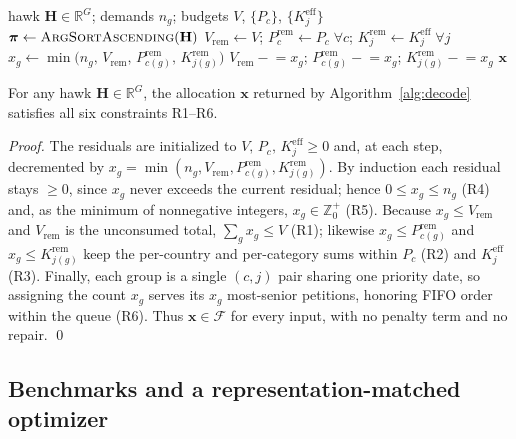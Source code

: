 \documentclass[runningheads]{llncs}
\begin{document}
\begin{algorithm}[t]
\caption{Feasibility-preserving SPV + greedy decoder}
\label{alg:decode}
\begin{algorithmic}[1]
\Require hawk $\mathbf{H}\in\mathbb{R}^{G}$; demands $n_g$; budgets $V$, $\{P_c\}$, $\{K_j^{\text{eff}}\}$
\State $\boldsymbol{\pi} \gets \textsc{ArgSortAscending}(\mathbf{H})$ 
\State $V_{\text{rem}} \gets V$;\; $P^{\text{rem}}_c \gets P_c\;\forall c$;\; $K^{\text{rem}}_j \gets K_j^{\text{eff}}\;\forall j$
 
  \State $x_g \gets \min\bigl(n_g,\, V_{\text{rem}},\, P^{\text{rem}}_{c(g)},\, K^{\text{rem}}_{j(g)}\bigr)$
  \State $V_{\text{rem}} \mathrel{-}= x_g$;\; $P^{\text{rem}}_{c(g)} \mathrel{-}= x_g$;\; $K^{\text{rem}}_{j(g)} \mathrel{-}= x_g$
\EndFor
\State \Return $\mathbf{x}$ 
\end{algorithmic}
\end{algorithm}

\begin{proposition}
\label{prop:feas}
For any hawk $\mathbf{H}\in\mathbb{R}^{G}$, the allocation $\mathbf{x}$ returned by Algorithm~\ref{alg:decode} satisfies all six constraints R1--R6.
\end{proposition}

\begin{proof}
The residuals are initialized to $V,\,P_c,\,K_j^{\text{eff}}\ge 0$ and, at each step, decremented by $x_g=\min(n_g,V_{\text{rem}},P^{\text{rem}}_{c(g)},K^{\text{rem}}_{j(g)})$. By induction each residual stays $\ge 0$, since $x_g$ never exceeds the current residual; hence $0\le x_g\le n_g$ (R4) and, as the minimum of nonnegative integers, $x_g\in\mathbb{Z}^{+}_0$ (R5). Because $x_g\le V_{\text{rem}}$ and $V_{\text{rem}}$ is the unconsumed total, $\sum_g x_g\le V$ (R1); likewise $x_g\le P^{\text{rem}}_{c(g)}$ and $x_g\le K^{\text{rem}}_{j(g)}$ keep the per-country and per-category sums within $P_c$ (R2) and $K_j^{\text{eff}}$ (R3). Finally, each group is a single $(c,j)$ pair sharing one priority date, so assigning the count $x_g$ serves its $x_g$ most-senior petitions, honoring FIFO order within the queue (R6). Thus $\mathbf{x}\in\mathcal{F}$ for every input, with no penalty term and no repair. \qed
\end{proof}

\subsection{Benchmarks and a representation-matched optimizer}
\label{sec:nsga}
\end{document}
